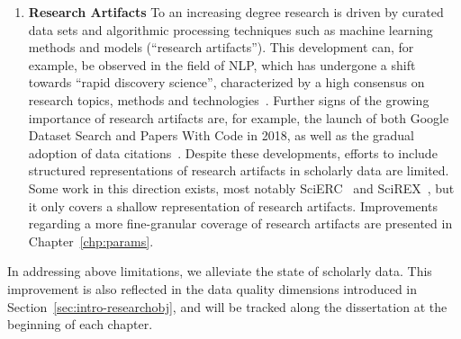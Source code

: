 \begin{enumerate}
    \item \textbf{Research Artifacts} To an increasing degree research is driven by curated data sets and algorithmic processing techniques such as machine learning methods and models (``research artifacts''). This development can, for example, be observed in the field of NLP, which has undergone a shift towards ``rapid discovery science'', characterized by a high consensus on research topics, methods and technologies~\cite{Jurgens2018}. Further signs of the growing importance of research artifacts are, for example, the launch of both Google Dataset Search and Papers With Code in 2018, as well as the gradual adoption of data citations~\cite{Kratz2015}.
Despite these developments, efforts to include structured representations of research artifacts in scholarly data are limited. Some work in this direction exists, most notably SciERC~\cite{luan2018scierc} and SciREX~\cite{Jain2020scirex}, but it only covers a shallow representation of research artifacts. Improvements regarding a more fine-granular coverage of research artifacts are presented in Chapter~\ref{chp:params}.
\end{enumerate}

In addressing above limitations, we alleviate the state of scholarly data. This improvement is also reflected in the data quality dimensions introduced in Section~\ref{sec:intro-researchobj}, and will be tracked along the dissertation at the beginning of each chapter.






